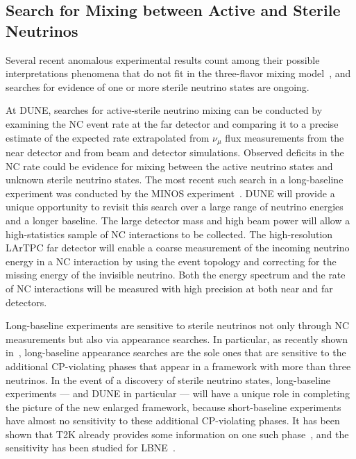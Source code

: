 \subsection{Search for Mixing between Active and Sterile Neutrinos}

Several recent anomalous experimental results count among their possible
interpretations phenomena that do not fit in the three-flavor mixing
model~\cite{Aguilar:2001ty,AguilarArevalo:2007it,Aguilar-Arevalo:2013pmq,Mention:2011rk,Giunti:2010zu}, 
and searches for evidence of one or more sterile neutrino states are ongoing.

At DUNE, searches for active-sterile neutrino mixing can be
conducted by examining the NC event rate at the far detector and
comparing it to a precise estimate of the expected rate extrapolated
from $\nu_\mu$ flux measurements from the  
near detector and from 
beam and detector simulations. Observed deficits in the NC rate could be evidence for mixing between the
active neutrino states and unknown sterile neutrino states. The most recent such search
in a long-baseline experiment was conducted by the MINOS
experiment~\cite{Sousa:2015bxa,Adamson:2011ku}.  DUNE will provide a unique
opportunity to revisit this search over a large
range of neutrino energies and a longer baseline. The large detector mass and high beam power will
allow a high-statistics sample of NC interactions to be collected.
The high-resolution LArTPC far detector
will enable a coarse measurement of the incoming neutrino
energy in a NC interaction by using the event topology and correcting
for the missing energy of the invisible neutrino.  Both the
energy spectrum and the rate of NC interactions will be measured
with high precision at both near and far detectors.

Long-baseline experiments are sensitive to sterile neutrinos not only
through NC measurements but also via appearance searches.  In
particular, as recently shown in~\cite{Klop:2014ima}, long-baseline
appearance searches are the sole ones that are sensitive to the
additional CP-violating phases that appear in a framework with more
than three neutrinos.  In the event of a discovery of sterile neutrino
states, long-baseline experiments --- and DUNE in particular ---  will have a
unique role in completing the picture of the new enlarged framework,
because short-baseline experiments have almost no sensitivity to these
additional CP-violating phases.  It has been shown that T2K already
provides some information on one such phase~\cite{Klop:2014ima}, %
 and the sensitivity has been studied
for LBNE~\cite{Hollander:2014iha}.


